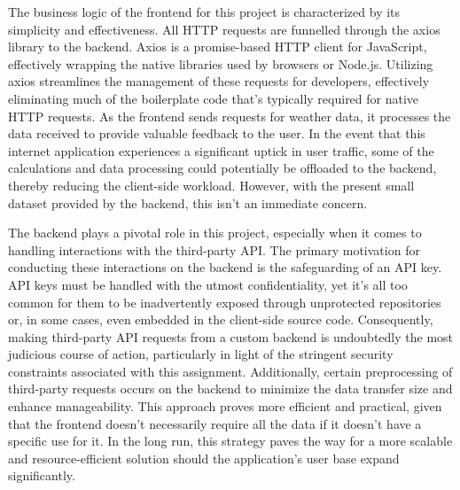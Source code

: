 \documentclass[a4paper,12pt]{article}
\begin{document}
The business logic of the frontend for this project is characterized by its simplicity and effectiveness. All HTTP requests are funnelled through the axios library to the backend. Axios is a promise-based HTTP client for JavaScript, effectively wrapping the native libraries used by browsers or Node.js. Utilizing axios streamlines the management of these requests for developers, effectively eliminating much of the boilerplate code that's typically required for native HTTP requests. As the frontend sends requests for weather data, it processes the data received to provide valuable feedback to the user. In the event that this internet application experiences a significant uptick in user traffic, some of the calculations and data processing could potentially be offloaded to the backend, thereby reducing the client-side workload. However, with the present small dataset provided by the backend, this isn't an immediate concern.

The backend plays a pivotal role in this project, especially when it comes to handling interactions with the third-party API. The primary motivation for conducting these interactions on the backend is the safeguarding of an API key. API keys must be handled with the utmost confidentiality, yet it's all too common for them to be inadvertently exposed through unprotected repositories or, in some cases, even embedded in the client-side source code. Consequently, making third-party API requests from a custom backend is undoubtedly the most judicious course of action, particularly in light of the stringent security constraints associated with this assignment. Additionally, certain preprocessing of third-party requests occurs on the backend to minimize the data transfer size and enhance manageability. This approach proves more efficient and practical, given that the frontend doesn't necessarily require all the data if it doesn't have a specific use for it. In the long run, this strategy paves the way for a more scalable and resource-efficient solution should the application's user base expand significantly.
\end{document}
